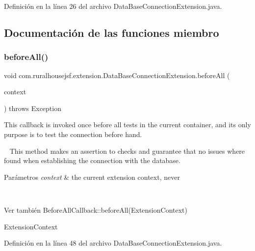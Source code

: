 Definición en la línea 26 del archivo Data\+Base\+Connection\+Extension.\+java.



\subsection{Documentación de las funciones miembro}
\mbox{\label{a00264_ae1fe703d5f0bdd5f29f0f4b9f0645e3e}} 
\subsubsection{\texorpdfstring{beforeAll()}{beforeAll()}}
{\footnotesize\ttfamily void com.\+ruralhousejsf.\+extension.\+Data\+Base\+Connection\+Extension.\+before\+All (\begin{DoxyParamCaption}\item[{Extension\+Context}]{context }\end{DoxyParamCaption}) throws Exception}



This callback is invoked once {\ttfamily before} all tests in the current container, and its only purpose is to test the connection before hand. 

~\newline
 This method makes an assertion to checks and guarantee that no issues where found when establishing the connection with the database.


\begin{DoxyParams}{Parámetros}
{\em context} & the current extension context, never
\begin{DoxyCode}{1}
\DoxyCodeLine{\textcolor{keyword}{null} }
\end{DoxyCode}
\\
\hline
\end{DoxyParams}
\begin{DoxySeeAlso}{Ver también}
Before\+All\+Callback\+::before\+All(\+Extension\+Context) 

Extension\+Context 
\end{DoxySeeAlso}


Definición en la línea 48 del archivo Data\+Base\+Connection\+Extension.\+java.



